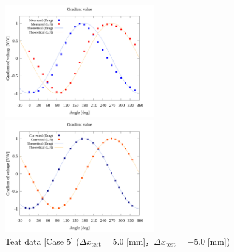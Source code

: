 \begin{figure}[htbp]
  \begin{minipage}[b]{0.45\linewidth}
    \centering
    \includegraphics[width=65mm]{../../02_workspace/result/offset_dx=5.0_dy=-5.0/plot/20/20_adjust-value.png}
  \end{minipage}
  \begin{minipage}[b]{0.45\linewidth}
    \centering
    \includegraphics[width=65mm]{../../02_workspace/result/offset_dx=5.0_dy=-5.0/plot/21/21-2_summary_offset.png}
  \end{minipage}
  \caption{Teat data [Case 5] ($\Delta x_\mathrm{test} = 5.0$ [mm]，$\Delta x_\mathrm{test} = -5.0$ [mm])}
\end{figure}

\newpage


